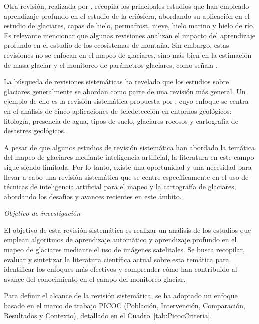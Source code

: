Otra revisión, realizada por , recopila los principales estudios que han empleado aprendizaje profundo en el estudio de la criósfera, abordando su aplicación en el estudio de glaciares, capas de hielo, permafrost, nieve, hielo marino y hielo de río. Es relevante mencionar que algunas revisiones analizan el impacto del aprendizaje profundo en el estudio de los ecosistemas de montaña. Sin embargo, estas revisiones no se enfocan en el mapeo de glaciares, sino más bien en la estimación de masa glaciar y el monitoreo de parámetros glaciares, como señala .

La búsqueda de revisiones sistemáticas ha revelado que los estudios sobre glaciares generalmente se abordan como parte de una revisión más general. Un ejemplo de ello es la revisión sistemática propuesta por , cuyo enfoque se centra en el análisis de cinco aplicaciones de teledetección en entornos geológicos: litología, presencia de agua, tipos de suelo, glaciares rocosos y cartografía de desastres geológicos.

A pesar de que algunos estudios de revisión sistemática han abordado la temática del mapeo de glaciares mediante inteligencia artificial, la literatura en este campo sigue siendo limitada. Por lo tanto, existe una oportunidad y una necesidad para llevar a cabo una revisión sistemática que se centre específicamente en el uso de técnicas de inteligencia artificial para el mapeo y la cartografía de glaciares, abordando los desafíos y avances recientes en este ámbito.

\textit{Objetivo de investigación}

El objetivo de esta revisión sistemática es realizar un análisis de los estudios que emplean algoritmos de aprendizaje automático y aprendizaje profundo en el mapeo de glaciares mediante el uso de imágenes satelitales. Se busca recopilar, evaluar y sintetizar la literatura científica actual sobre esta temática para identificar los enfoques más efectivos y comprender cómo han contribuido al avance del conocimiento en el campo del monitoreo glaciar.

Para definir el alcance de la revisión sistemática, se ha adoptado un enfoque basado en el marco de trabajo PICOC (Población, Intervención, Comparación, Resultados y Contexto), detallado en el Cuadro~\ref{tab:PicocCriteria}.

